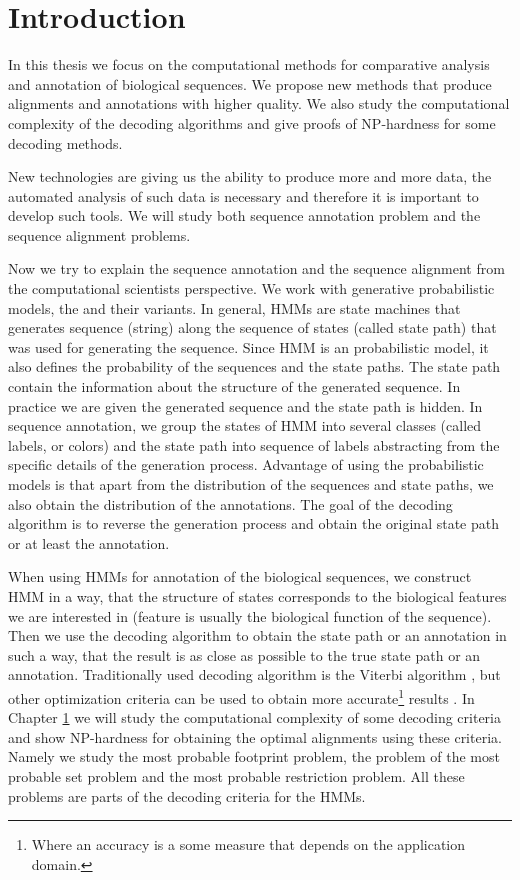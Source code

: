 \chapter{Introduction}


In this thesis we focus on the computational methods for comparative analysis
and annotation of biological sequences. We propose new methods that produce
alignments and annotations with higher quality. We also study the computational
complexity of the decoding algorithms and give proofs of NP-hardness for some
decoding methods. 

New technologies are giving us the ability to produce more and more data, the
automated analysis of such data is necessary and therefore it is important to
develop such tools. We will study both sequence annotation problem and the
sequence alignment problems. 

Now we try to explain the sequence annotation and the sequence alignment from
the computational scientists perspective. We work with generative probabilistic
models, the  and their variants. In
general, HMMs are state machines that generates sequence (string) along the
sequence of states (called state path) that was used for generating the
sequence. Since HMM is an probabilistic model, it also defines the probability
of the sequences and the state paths. The state path contain the information
about the structure of the generated sequence. In practice we are given the
generated sequence and the state path is hidden. In sequence annotation, we
group the states of HMM into several classes (called labels, or colors) and the
state path into sequence of labels abstracting from the specific details of the
generation process. Advantage of using the probabilistic models is that apart
from the distribution of the sequences and state paths, we also obtain the
distribution of the annotations. The goal of the decoding algorithm is to
reverse the generation process and obtain the original state path or at least
the annotation. 

When using HMMs for annotation of the biological sequences, we construct HMM in
a way, that the structure of states corresponds to the biological features we
are interested in (feature is usually the biological function of the sequence).
Then we use the decoding algorithm to obtain the state path or an annotation in
such a way, that the result is as close as possible to the true state path or
an annotation. Traditionally used decoding algorithm is the Viterbi algorithm
\cite{}, but other optimization criteria can be used to obtain more
accurate\footnote{Where an accuracy is a some measure that depends on the
application domain.} results \cite{}. In Chapter \ref{} we will study the
computational complexity of some decoding criteria and show NP-hardness for
obtaining the optimal alignments using these criteria. Namely we study the most
probable footprint problem, the problem of the most probable set problem and
the most probable restriction problem. All these problems are parts of the
decoding criteria for the HMMs.


